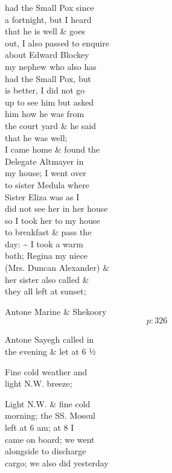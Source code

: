 \documentclass{report}
\begin{document}
	\par{
 	had the Small Pox since\ \\a fortnight, but I heard\ \\that he is well \& goes\ \\out, I also passed to enquire\ \\about Edward Blockey\ \\my nephew who also has\ \\had the Small Pox, but\ \\is better, I did not go\ \\up to see him but asked\ \\him how he was from\ \\the court yard \& he said\ \\that he was well;\ \\I came home \& found the\ \\Delegate Altmayer in\ \\my house; I went over\ \\to sister Medula where\ \\Sister Eliza was as I\ \\did not see her in her house\ \\so I took her to my house\ \\to breakfast \& pass the\ \\day: \~{} I took a warm\ \\bath; Regina my niece\ \\(Mrs. Duncan Alexander) \&\ \\her sister also called \&\ \\they all left at sunset;\ \\
	}

	\par{
 	Antone Marine \& Shekoory\ \\
  \[p: 326 \]

	}

	\par{
 	Antone Sayegh called in\ \\the evening \& let at 6 ½\ \\
	}

	\par{
 	Fine cold weather and\ \\light N.W. breeze;\ \\
	}

	\par{
 	Light N.W. \& fine cold\ \\morning; the SS. Mossul\ \\left at 6 am; at 8 I\ \\came on board; we went\ \\alongside to discharge\ \\cargo; we also did yesterday\ \\
	}
\end{document}
